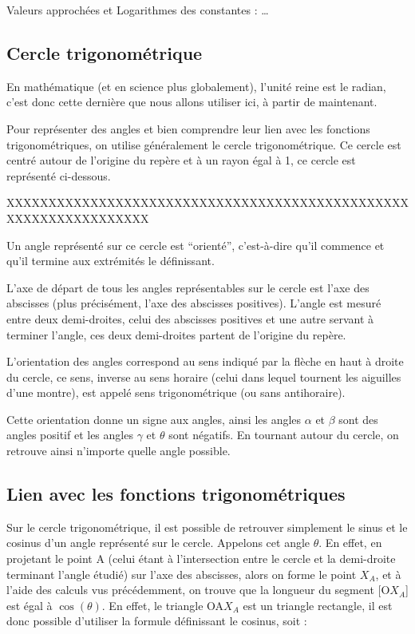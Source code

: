 \documentclass[a4paper]{article}
\begin{document}
				Valeurs approchées et Logarithmes des constantes : …

		\subsection{Cercle trigonométrique}

			En mathématique (et en science plus globalement), l'unité reine est le radian, c'est donc cette dernière que nous allons utiliser ici, à partir de maintenant.

			Pour représenter des angles et bien comprendre leur lien avec les fonctions trigonométriques, on utilise généralement le cercle trigonométrique. Ce cercle est centré autour de l'origine du repère et à un rayon égal à 1, ce cercle est représenté ci-dessous. 

			XXXXXXXXXXXXXXXXXXXXXXXXXXXXXXXXXXXXXXXXXXXXXXXXXXXXXXXXXXXXXXXXX

			Un angle représenté sur ce cercle est “orienté”, c'est-à-dire qu'il commence et qu'il termine aux extrémités le définissant.

			L'axe de départ de tous les angles représentables sur le cercle est l'axe des abscisses (plus précisément, l'axe des abscisses positives). L'angle est mesuré entre deux demi-droites, celui des abscisses positives et une autre servant à terminer l'angle, ces deux demi-droites partent de l'origine du repère.

			L'orientation des angles correspond au sens indiqué par la flèche en haut à droite du cercle, ce sens, inverse au sens horaire (celui dans lequel tournent les aiguilles d'une montre), est appelé sens trigonométrique (ou sans antihoraire).

			Cette orientation donne un signe aux angles, ainsi les angles $\alpha$ et $\beta$ sont des angles positif et les angles $\gamma$ et $\theta$ sont négatifs. En tournant autour du cercle, on retrouve ainsi n'importe quelle angle possible. 

		\subsection{Lien avec les fonctions trigonométriques}

			Sur le cercle trigonométrique, il est possible de retrouver simplement le sinus et le cosinus d'un angle représenté sur le cercle. Appelons cet angle $\theta$. En effet, en projetant le point A (celui étant à l'intersection entre le cercle et la demi-droite terminant l'angle étudié) sur l'axe des abscisses, alors on forme le point $X_A$, et à l'aide des calculs vus précédemment, on trouve que la longueur du segment [O$X_A$] est égal à $\cos(\theta)$. En effet, le triangle OA$X_A$ est un triangle rectangle, il est donc possible d'utiliser la formule définissant le cosinus, soit :
\end{document}
